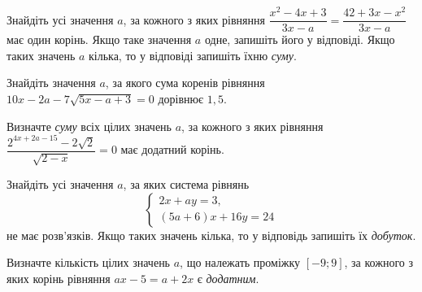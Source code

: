 \documentclass[12pt]{article}
\begin{document}
\begin{samepage}
\noindent\zadnum Знайдіть усі значення $a$, за кожного з яких рівняння $\dfrac{x^2 - 4x + 3}{3x - a} = \dfrac{42 + 3x - x^2}{3x - a}$ має один корінь. Якщо таке значення $a$ одне, запишіть його у відповіді. Якщо таких значень $a$ кілька, то у відповіді запишіть їхню \textit{суму}. 

\nmtnobreak
\nopagebreak\nbvspace{0.3cm}
\nmtAnswerBox
\par{}
\end{samepage}

\begin{samepage}
\noindent\zadnum Знайдіть значення $a$, за якого сума коренів рівняння $10x - 2a - 7\sqrt{5x - a + 3} = 0$ дорівнює $1{,}5$. 

\nmtnobreak
\nopagebreak\nbvspace{0.3cm}
\nmtAnswerBox
\par{}
\end{samepage}

\begin{samepage}
\noindent\zadnum Визначте \textit{суму} всіх цілих значень $a$, за кожного з яких рівняння $\dfrac{2^{4x+2a-15} - 2\sqrt{2}}{\sqrt{2 - x}} = 0$ має додатний корінь. 

\nmtnobreak
\nopagebreak\nbvspace{0.3cm}
\nmtAnswerBox
\par{}
\end{samepage}

\begin{samepage}
\noindent\zadnum Знайдіть усі значення $a$, за яких система рівнянь
$$
\begin{cases}
2x + ay = 3, \\
(5a + 6)x + 16y = 24
\end{cases}
$$
не має розв'язків. Якщо таких значень кілька, то у відповідь запишіть їх \textit{добуток}. 

\nmtnobreak
\nopagebreak\nbvspace{0.3cm}
\nmtAnswerBox
\par{}
\end{samepage}

\begin{samepage}
\noindent\zadnum Визначте кількість цілих значень $a$, що належать проміжку $[-9; 9]$, за кожного з яких корінь рівняння $ax - 5 = a + 2x$ є \textit{додатним}. 

\nmtnobreak
\nopagebreak\nbvspace{0.3cm}
\nmtAnswerBox
\par{}
\end{samepage}
\end{document}
